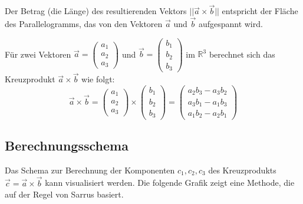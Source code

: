 Der Betrag (die Länge) des resultierenden Vektors \(||\vec{a} \times
\vec{b}||\) entspricht der Fläche des Parallelogramms, das von den Vektoren
\(\vec{a}\) und \(\vec{b}\) aufgespannt wird.

Für zwei Vektoren \(\vec{a} = \begin{pmatrix} a_1 \\ a_2 \\ a_3 \end{pmatrix}\) und \(\vec{b} = \begin{pmatrix} b_1 \\ b_2 \\ b_3 \end{pmatrix}\) im \(\mathbb{R}^3\) berechnet sich das Kreuzprodukt \(\vec{a} \times \vec{b}\) wie folgt:
\[ \vec{a} \times \vec{b} = \begin{pmatrix} a_1 \\ a_2 \\ a_3 \end{pmatrix} \times \begin{pmatrix} b_1 \\ b_2 \\ b_3 \end{pmatrix} = \begin{pmatrix} a_2 b_3 - a_3 b_2 \\ a_3 b_1 - a_1 b_3 \\ a_1 b_2 - a_2 b_1 \end{pmatrix} \]

\subsection{Berechnungsschema}
Das Schema zur Berechnung der Komponenten \(c_1, c_2, c_3\) des Kreuzprodukts
\(\vec{c} = \vec{a} \times \vec{b}\) kann visualisiert werden. Die folgende
Grafik zeigt eine Methode, die auf der Regel von Sarrus basiert.


